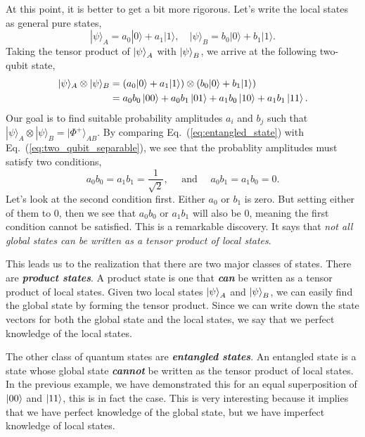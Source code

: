 At this point, it is better to get a bit more rigorous.
Let's write the local states as general pure states,
\begin{equation}
    |\psi\rangle_A = a_0|0\rangle + a_1|1\rangle, \quad |\psi\rangle_B = b_0|0\rangle + b_1|1\rangle.
\end{equation}
Taking the tensor product of $\left| \psi \right\rangle_A$ with $\left| \psi \right\rangle_B$, we arrive at the following two-qubit state, 
\begin{align}
    |\psi\rangle_{A} \otimes|\psi\rangle_{B} & = \left(a_{0}|0\rangle+a_{1}|1\rangle\right) \otimes\left(b_{0}|0\rangle+b_{1}|1\rangle\right) \nonumber\\
    & = a_0 b_0\left| 00 \right\rangle + a_0 b_1\left| 01 \right\rangle + a_1 b_0\left| 10 \right\rangle + a_1 b_1\left| 11 \right\rangle.
    \label{eq:two_qubit_separable}
\end{align}
Our goal is to find suitable probability amplitudes $a_i$ and $b_j$ such that $|\psi\rangle_{A} \otimes|\psi\rangle_{B} = |\Phi^+\rangle_{AB}$.
By comparing Eq.~(\ref{eq:entangled_state}) with Eq.~(\ref{eq:two_qubit_separable}), we see that the probablity amplitudes must satisfy two conditions,
\begin{equation}
    a_0 b_0 = a_1 b_1 = \frac{1}{\sqrt{2}}, \quad \text{ and }\quad a_0 b_1 = a_1 b_0 = 0.
\end{equation}
Let's look at the second condition first.
Either $a_0$ or $b_1$ is zero.
But setting either of them to 0, then we see that $a_0 b_0$ or $a_1 b_1$ will also be 0, meaning the first condition cannot be satisfied.
This is a remarkable discovery.
It says that \emph{not all global states can be written as a tensor product of local states}.

This leads us to the realization that there are two major classes of states.
There are \textbf{\emph{product states}}.
A product state is one that \textbf{\emph{can}} be written as a tensor product of local states.
Given two local states $\left| \psi \right\rangle_A$ and $\left| \psi \right\rangle_B$, we can easily find the global state by forming the tensor product.
Since we can write down the state vectors for both the global state and the local states, we say that we perfect knowledge of the local states.

The other class of quantum states are \textbf{\emph{entangled states}}.
An entangled state is a state whose global state \textbf{\emph{cannot}} be written as the tensor product of local states.
In the previous example, we have demonstrated this for an equal superposition of $\left| 00 \right\rangle$ and $\left| 11 \right\rangle$, this is in fact the case.
This is very interesting because it implies that we have perfect knowledge of the global state, but we have imperfect knowledge of local states.



